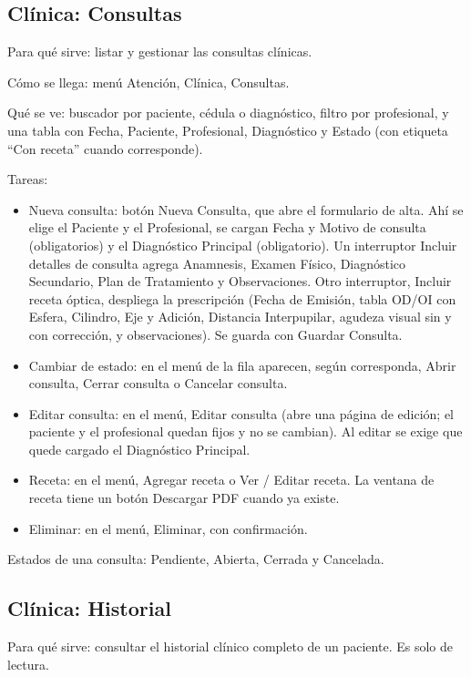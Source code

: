\subsection{Clínica: Consultas}
\label{sec:mu-clinica-consultas}

Para qué sirve: listar y gestionar las consultas clínicas.

Cómo se llega: menú Atención, Clínica, Consultas.

Qué se ve: buscador por paciente, cédula o diagnóstico, filtro por profesional, y una tabla con Fecha, Paciente, Profesional, Diagnóstico y Estado (con etiqueta ``Con receta'' cuando corresponde).

Tareas:
\begin{itemize}
  \item Nueva consulta: botón Nueva Consulta, que abre el formulario de alta. Ahí se elige el Paciente y el Profesional, se cargan Fecha y Motivo de consulta (obligatorios) y el Diagnóstico Principal (obligatorio). Un interruptor Incluir detalles de consulta agrega Anamnesis, Examen Físico, Diagnóstico Secundario, Plan de Tratamiento y Observaciones. Otro interruptor, Incluir receta óptica, despliega la prescripción (Fecha de Emisión, tabla OD/OI con Esfera, Cilindro, Eje y Adición, Distancia Interpupilar, agudeza visual sin y con corrección, y observaciones). Se guarda con Guardar Consulta.
  \item Cambiar de estado: en el menú de la fila aparecen, según corresponda, Abrir consulta, Cerrar consulta o Cancelar consulta.
  \item Editar consulta: en el menú, Editar consulta (abre una página de edición; el paciente y el profesional quedan fijos y no se cambian). Al editar se exige que quede cargado el Diagnóstico Principal.
  \item Receta: en el menú, Agregar receta o Ver / Editar receta. La ventana de receta tiene un botón Descargar PDF cuando ya existe.
  \item Eliminar: en el menú, Eliminar, con confirmación.
\end{itemize}

Estados de una consulta: Pendiente, Abierta, Cerrada y Cancelada.

\subsection{Clínica: Historial}
\label{sec:mu-clinica-historial}

Para qué sirve: consultar el historial clínico completo de un paciente. Es solo de lectura.

